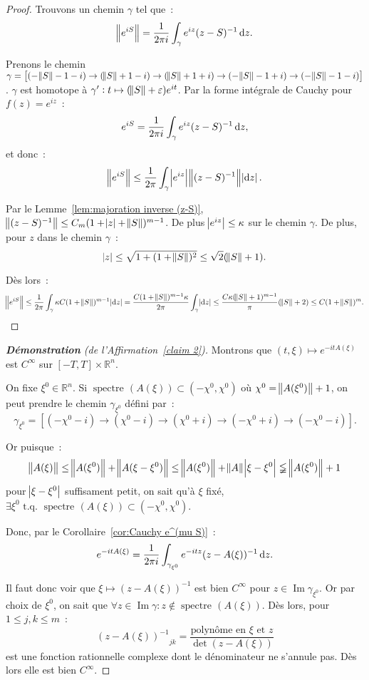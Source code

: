 \documentclass{report}
\DeclareMathOperator{\spectreOperator}{spectre\!}
\DeclareMathOperator{\Imapp}{Im}
\newcommand{\R}{{\mathbb R}}
\newcommand{\tq}{\text{ t.q. }}
\newcommand{\st}{\tq}
\newcommand{\spectre}[1]{{\spectreOperator\left(#1\right)}}
\theoremstyle{definition}
\theoremstyle{remark}
\begin{document}
\begin{proof} Trouvons un chemin $\gamma$ tel que~:
\[\norm {e^{iS}} = \frac 1{2\pi i}\int_\gamma e^{iz}(z-S)^{-1}\dif z.\]

Prenons le chemin $\gamma = \left[(-\norm S-1 - i) \to (\norm S+1-i) \to (\norm S+1+i) \to (-\norm S-1+i) \to (-\norm S-1-i)\right]$. $\gamma$ est homotope à
$\gamma' : t \mapsto (\norm S + \varepsilon)e^{it}$. Par la forme intégrale de Cauchy pour $f(z) = e^{iz}$~:
\[e^{iS} = \frac 1{2\pi i}\int_\gamma e^{iz}(z-S)^{-1}\dif z,\]
et donc~:
\[\norm {e^{iS}} \leq \frac 1{2\pi}\int_\gamma\abs {e^{iz}}\norm {(z-S)^{-1}}\abs {\dif z}.\]

Par le Lemme~\ref{lem:majoration inverse (z-S)}, $\norm {(z-S)^{-1}} \leq C_m(1+\abs z + \norm S)^{m-1}$. De plus $\abs {e^{iz}} \leq \kappa$ sur le chemin $\gamma$.
De plus, pour $z$ dans le chemin $\gamma$~:
\[\abs z \leq \sqrt {1 + (1+\norm S)^2} \leq \sqrt 2(\norm S + 1).\]

Dès lors~:
\[\norm {e^{iS}} \leq \frac 1{2\pi}\int_\gamma\kappa C(1+\norm S)^{m-1}\abs {\dif z} = \frac {C(1+\norm S)^{m-1}\kappa}{2\pi}\int_\gamma\abs {\dif z}
	\leq \frac {C\kappa(\norm S + 1)^{m-1}}\pi(\norm S + 2) \leq C(1+\norm S)^m.\]
\end{proof}

\begin{proof}[\textnormal {\textbf {Démonstration} (de l'Affirmation~\ref{claim 2})}] Montrons que $(t, \xi) \mapsto e^{-itA(\xi)}$ est $C^\infty$ sur $[-T, T] \times \R^n$.

On fixe $\xi^0 \in \R^n$. Si $\spectre {A(\xi)} \subset (-\chi^0, \chi^0)$ où
$\chi^0 = \norm {A(\xi^0)}+1$, on peut prendre le chemin $\gamma_{\xi^0}$ défini par~:
\[\gamma_{\xi^0} = \left[(-\chi^0-i) \to (\chi^0-i) \to (\chi^0+i) \to (-\chi^0+i) \to (-\chi^0-i)\right].\]

Or puisque~:
\[\norm {A(\xi)} \leq \norm {A(\xi^0)} + \norm {A(\xi-\xi^0)} \leq \norm {A(\xi^0)} + \norm A\abs {\xi-\xi^0} \lneqq \norm {A(\xi^0)} + 1\]
pour $\abs {\xi-\xi^0}$ suffisament petit, on sait qu'à $\xi$ fixé, $\exists \xi^0 \st \spectre {A(\xi)} \subset (-\chi^0, \chi^0)$.

Donc, par le Corollaire~\ref{cor:Cauchy e^(mu S)}~:
\begin{equation}\label{eq:forme intégrale Cauchy e^(-itA(xi))}
	e^{-itA(\xi)} = \frac 1{2\pi i}\int_{\gamma_{\xi^0}}e^{-itz}(z-A(\xi))^{-1}\dif z.
\end{equation}

Il faut donc voir que $\xi \mapsto (z-A(\xi))^{-1}$ est bien $C^\infty$ pour $z \in \Imapp \gamma_{\xi^0}$. Or par choix de $\xi^0$, on sait que
$\forall z \in \Imapp \gamma : z \not \in \spectre {A(\xi)}$. Dès lors, pour $1 \leq j, k \leq m$~:
\[{(z-A(\xi))^{-1}}_{jk} = \frac {\text{polynôme en $\xi$ et $z$}}{\det(z-A(\xi))}\]
est une fonction rationnelle complexe dont le dénominateur ne s'annule pas. Dès lors elle est bien $C^\infty$.
\end{proof}
\end{document}
